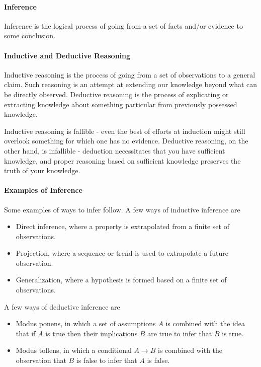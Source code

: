 \paragraph{Inference}
Inference is the logical process of going from a set of facts and/or evidence to some conclusion.

\paragraph{Inductive and Deductive Reasoning}
Inductive reasoning is the process of going from a set of observations to a general claim. Such reasoning is an attempt at extending our knowledge beyond what can be directly observed. Deductive reasoning is the process of explicating or extracting knowledge about something particular from previously possessed knowledge.

Inductive reasoning is fallible - even the best of efforts at induction might still overlook something for which one has no evidence. Deductive reasoning, on the other hand, is infallible - deduction necessitates that you have sufficient knowledge, and proper reasoning based on sufficient knowledge preserves the truth of your knowledge.

\paragraph{Examples of Inference}
Some examples of ways to infer follow. A few ways of inductive inference are
\begin{itemize}
	\item Direct inference, where a property is extrapolated from a finite set of observations.
	\item Projection, where a sequence or trend is used to extrapolate a future observation.
	\item Generalization, where a hypothesis is formed based on a finite set of observations.
\end{itemize}

A few ways of deductive inference are
\begin{itemize}
	\item Modus ponens, in which a set of assumptions $A$ is combined with the idea that if $A$ is true then their implications $B$ are true to infer that $B$ is true.
	\item Modus tollens, in which a conditional $A\to B$ is combined with the observation that $B$ is false to infer that $A$ is false. 
\end{itemize}

